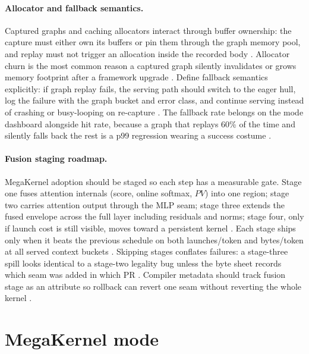\paragraph{Allocator and fallback semantics.}
Captured graphs and caching allocators interact through buffer ownership: the capture must either own its buffers or pin them through the graph memory pool, and replay must not trigger an allocation inside the recorded body \citep{nvidia2024cudagraphs,memoryfloor2026}. Allocator churn is the most common reason a captured graph silently invalidates or grows memory footprint after a framework upgrade \citep{kwon2023vllm,patel2025llminference}. Define fallback semantics explicitly: if graph replay fails, the serving path should switch to the eager hull, log the failure with the graph bucket and error class, and continue serving instead of crashing or busy-looping on re-capture \citep{taxbreak2026,yirage2026}. The fallback rate belongs on the mode dashboard alongside hit rate, because a graph that replays 60\% of the time and silently falls back the rest is a p99 regression wearing a success costume \citep{memoryfloor2026,chen2020compilerbasedhardw}.

\paragraph{Fusion staging roadmap.}
MegaKernel adoption should be staged so each step has a measurable gate. Stage one fuses attention internals (score, online softmax, $PV$) into one region; stage two carries attention output through the MLP seam; stage three extends the fused envelope across the full layer including residuals and norms; stage four, only if launch cost is still visible, moves toward a persistent kernel \citep{dao2022flashattention,semianalysis2024tma,yirage2026}. Each stage ships only when it beats the previous schedule on both launches/token and bytes/token at all served context buckets \citep{taxbreak2026,memoryfloor2026}. Skipping stages conflates failures: a stage-three spill looks identical to a stage-two legality bug unless the byte sheet records which seam was added in which PR \citep{patel2025llminference,chen2020compilerbasedhardw}. Compiler metadata should track fusion stage as an attribute so rollback can revert one seam without reverting the whole kernel \citep{yirage2026,nvidia2022hopper}.

\section{MegaKernel mode}
\label{sec:ch12_megakernel_mode}

